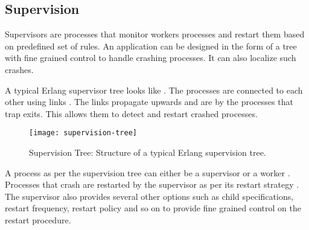 \subsection{Supervision}
\label{section:concepts.supervision}

Supervisors are processes that monitor workers processes and restart them based
on predefined set of rules. An application can be designed in the form of a
tree with fine grained control to handle crashing processes. It can also
localize such crashes.

A typical Erlang supervisor tree looks like . The
processes are connected to each other using links%
. The links propagate upwards and are  by the processes that trap
exits. This allows them to detect and restart crashed processes.

\begin{figure}
  \texttt{[image: supervision-tree]}
  \caption[Supervision Tree]{%
    Supervision Tree: Structure of a typical Erlang supervision tree.}
  \label{figure:supervision.tree}
  \normalcaption
\end{figure}

A process as per the supervision tree can either be a supervisor%
or a worker%
. Processes that crash are restarted by the supervisor as per its
restart strategy%
. The supervisor also provides several other options such as child
specifications, restart frequency, restart policy and so on to provide
fine grained control on the restart procedure.

